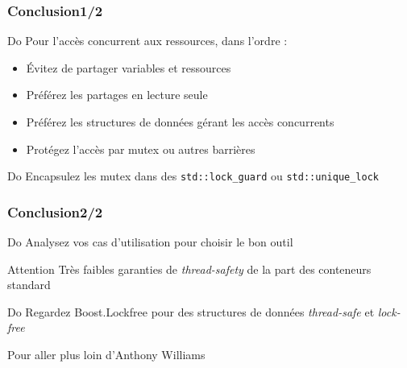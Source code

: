 \documentclass[C++.tex]{subfiles}
\begin{document}
\begin{frame}[fragile]
	\frametitle{Conclusion\titlehfill{}1/2}
	\begin{exampleblock}{Do}
		Pour l'accès concurrent aux ressources, dans l'ordre :
		\begin{itemize}
			\item Évitez de partager variables et ressources
			\item Préférez les partages en lecture seule
			\item Préférez les structures de données gérant les accès concurrents


			\item Protégez l'accès par mutex ou autres barrières
		\end{itemize}
	\end{exampleblock}

	\begin{exampleblock}{Do}
		Encapsulez les mutex dans des \lstinline|std::lock_guard| ou \lstinline|std::unique_lock|
	\end{exampleblock}
\end{frame}

\begin{frame}[fragile]
	\frametitle{Conclusion\titlehfill{}2/2}
	\begin{exampleblock}{Do}
		Analysez vos cas d'utilisation pour choisir le bon outil
	\end{exampleblock}

	\begin{alertblock}{Attention}
		Très faibles garanties de \textit{thread-safety} de la part des conteneurs standard

	\end{alertblock}

	\begin{exampleblock}{Do}
		Regardez Boost.Lockfree pour des structures de données \textit{thread-safe} et \textit{lock-free}
	\end{exampleblock}

	\begin{block}{Pour aller plus loin}
		\cite{ConcInAction} d'Anthony Williams

	\end{block}
\end{frame}
\end{document}
